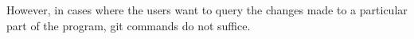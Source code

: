 However, in cases where the users want to query the changes made to a particular part of the program, git commands do not suffice. 
\begin{comment}
Consider a case where the user is looking for a specific change, that is, some string \textit{s} changed to \textit{t}.
Git consists of commands that can be used to query what was added or removed in each version. 
Such a command would return all the versions that added \textit{s} and all the versions that removed \textit{t} instead of just the version that replaced \textit{s} with \textit{t}.  Git also has commands that can track the changes made to a range of lines in the file. However, these are not accurate sometimes since the line numbers keep changing due to addition and deletion of lines.
Most of these commands are complex and sometimes require external scripts as well.

Consider a scenario where all the changes made to a function needs to be looked into for debugging purposes. A search for the function name will return all the versions that contain the function.  What we need in this case are all the versions that have some changes made to the function. Git log with the option -L searches the history of a range of lines specified by a start and an end. But this range will change when lines are added or deleted around the function, and therefore not all the changes are captured.
\end{Comment}
Hence there is a need for a language that is simple, and that enables users not just to look for patterns but also to look for changes in the history of software repositories.

\textbf{Prominent feature of GQL: Choice Patterns. Illustrated with an example}

In GQL, users can query the history similar to grep by using regular expressions.
An important feature is, however, to query specific changes. This can be achieved using the ``Choice Patterns."  In a choice pattern, users can specify a pattern for the text in the previous version and another pattern for the text in the later version. Therefore, retrieving only the versions that made such changes. 

For example, consider a C program shown in the listing~\ref{lst:v1}. The program consists of two functions along with the other functions; \texttt{get_record} returns a record value from a string in a particular format specified by the global variable \texttt{format}, \texttt{show_record} returns a string in the same format from a record value.


\end{comment}
